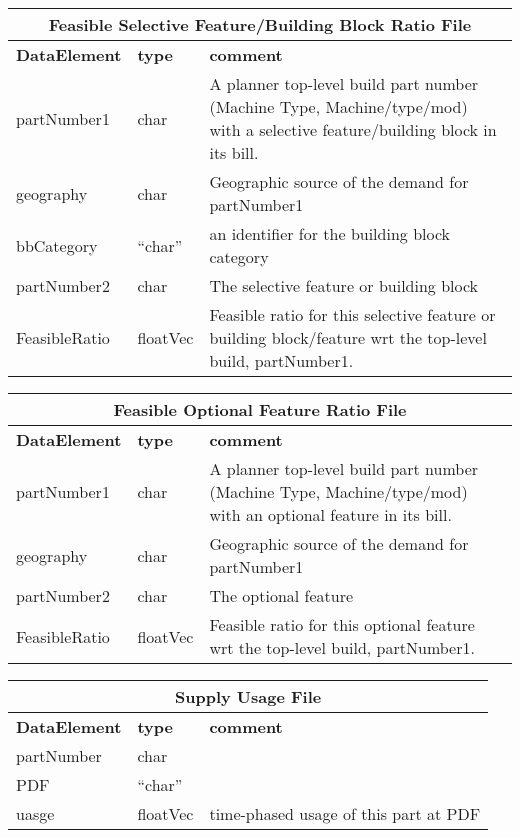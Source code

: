 \vspace{.5in}

\begin{tabular}{llp{4in}}
\multicolumn{3}{c}{{\bf Feasible Selective Feature/Building Block Ratio File}}\\ \hline\hline
{\bf DataElement} &  {\bf type}  &   {\bf comment} \\ \hline
partNumber1  & char &       A planner top-level build part number 
                            (Machine Type, Machine/type/mod)
                            with a selective feature/building block in its bill.  \\
geography   & char    &      Geographic source of the demand for partNumber1 \\
bbCategory &  ``char'' &    an identifier for the building block category  \\
partNumber2  & char &      The selective feature or building block \\

FeasibleRatio    & floatVec &   Feasible ratio for this selective feature or 
                            building block/feature wrt the top-level build, partNumber1. \\
\end{tabular}

\vspace{.5in}

\begin{tabular}{llp{4in}}
\multicolumn{3}{c}{{\bf Feasible Optional Feature Ratio File}}\\ \hline\hline
{\bf DataElement} &  {\bf type}  &   {\bf comment} \\ \hline
partNumber1  & char &       A planner top-level build part number 
                            (Machine Type, Machine/type/mod)
                            with an optional feature in its bill.  \\
geography    & char &      Geographic source of the demand for partNumber1 \\
partNumber2  & char &      The optional feature \\

FeasibleRatio    & floatVec &   Feasible ratio for this optional feature wrt
                        the top-level build, partNumber1. \\
\end{tabular}

\vspace{.5in}

\begin{tabular}{llp{4in}}
\multicolumn{3}{c}{{\bf Supply Usage File}}\\ \hline\hline
{\bf DataElement} &  {\bf type}  &   {\bf comment} \\ \hline
partNumber &  char     \\ 
PDF   & ``char''  \\
uasge          & floatVec &  time-phased usage of this part at PDF\\
\end{tabular}

